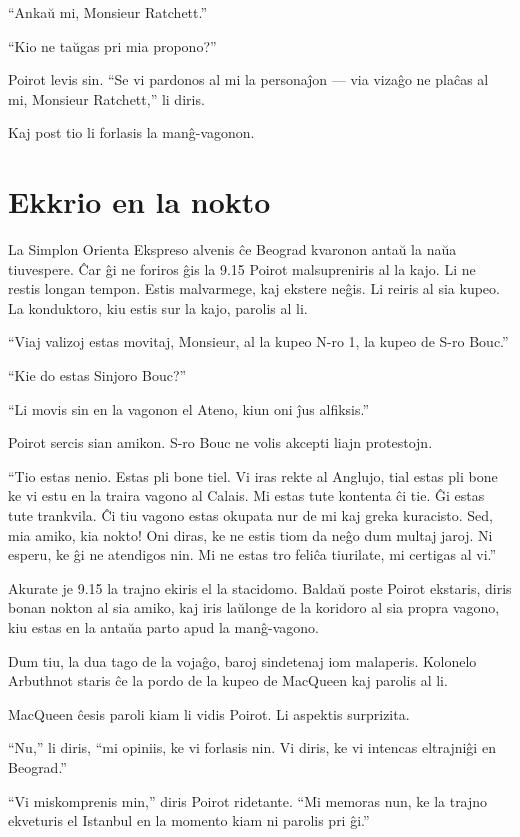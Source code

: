 ``Ankaŭ mi, Monsieur Ratchett.''

``Kio ne taŭgas pri mia propono?''

Poirot levis sin. ``Se vi pardonos al mi la personaĵon --- via vizaĝo ne plaĉas al mi, Monsieur Ratchett,'' li diris.

Kaj post tio li forlasis la manĝ-vagonon.

\chapter[Ekkrio en la nokto]{Ekkrio en la nokto}


La Simplon Orienta Ekspreso alvenis ĉe Beograd kvaronon antaŭ la naŭa tiuvespere. Ĉar ĝi ne foriros ĝis la 9.15 Poirot malsupreniris al la kajo. Li ne restis longan tempon. Estis malvarmege, kaj ekstere neĝis. Li reiris al sia kupeo. La konduktoro, kiu estis sur la kajo, parolis al li.

``Viaj valizoj estas movitaj, Monsieur, al la kupeo N-ro 1, la kupeo de S-ro Bouc.''

``Kie do estas Sinjoro Bouc?''

``Li movis sin en la vagonon el Ateno, kiun oni ĵus alfiksis.''

Poirot sercis sian amikon. S-ro Bouc ne volis akcepti liajn protestojn.

``Tio estas nenio. Estas pli bone tiel. Vi iras rekte al Anglujo, tial estas pli bone ke vi estu en la traira vagono al Calais. Mi estas tute kontenta ĉi tie. Ĝi estas tute trankvila. Ĉi tiu vagono estas okupata nur de mi kaj greka kuracisto. Sed, mia amiko, kia nokto! Oni diras, ke ne estis tiom da neĝo dum multaj jaroj. Ni esperu, ke ĝi ne atendigos nin. Mi ne estas tro feliĉa tiurilate, mi certigas al vi.''

Akurate je 9.15 la trajno ekiris el la stacidomo. Baldaŭ poste Poirot ekstaris, diris bonan nokton al sia amiko, kaj iris laŭlonge de la koridoro al sia propra vagono, kiu estas en la antaŭa parto apud la manĝ-vagono.

Dum tiu, la dua tago de la vojaĝo, baroj sindetenaj iom malaperis. Kolonelo Arbuthnot staris ĉe la pordo de la kupeo de MacQueen kaj parolis al li.

MacQueen ĉesis paroli kiam li vidis Poirot. Li aspektis surprizita.

``Nu,'' li diris, ``mi opiniis, ke vi forlasis nin. Vi diris, ke vi intencas eltrajniĝi en Beograd.''

``Vi miskomprenis min,'' diris Poirot ridetante. ``Mi memoras nun, ke la trajno ekveturis el Istanbul en la momento kiam ni parolis pri ĝi.''

